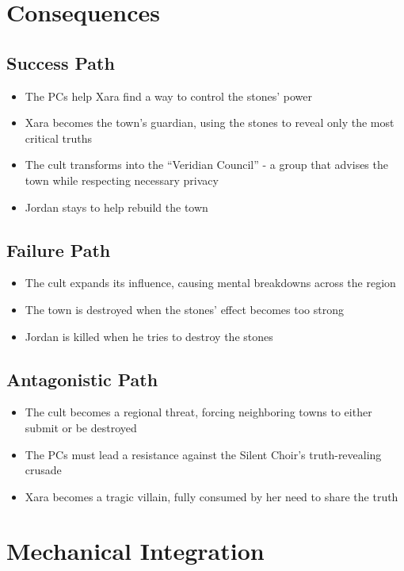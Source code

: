 \documentclass[11pt]{article}
\begin{document}
\section{Consequences}

\subsection{Success Path}
\begin{itemize}[leftmargin=*]
    \item The PCs help Xara find a way to control the stones' power
    \item Xara becomes the town's guardian, using the stones to reveal only the most critical truths
    \item The cult transforms into the ``Veridian Council'' - a group that advises the town while respecting necessary privacy
    \item Jordan stays to help rebuild the town
\end{itemize}

\subsection{Failure Path}
\begin{itemize}[leftmargin=*]
    \item The cult expands its influence, causing mental breakdowns across the region
    \item The town is destroyed when the stones' effect becomes too strong
    \item Jordan is killed when he tries to destroy the stones
\end{itemize}

\subsection{Antagonistic Path}
\begin{itemize}[leftmargin=*]
    \item The cult becomes a regional threat, forcing neighboring towns to either submit or be destroyed
    \item The PCs must lead a resistance against the Silent Choir's truth-revealing crusade
    \item Xara becomes a tragic villain, fully consumed by her need to share the truth
\end{itemize}

\section{Mechanical Integration}
\end{document}

